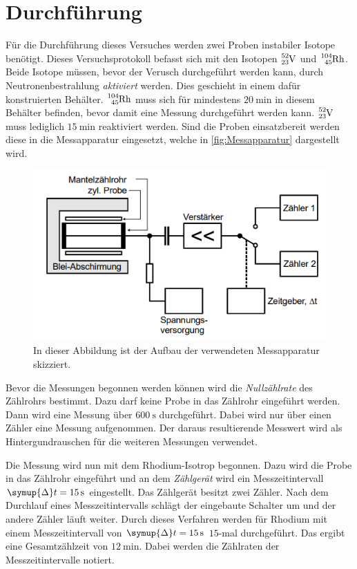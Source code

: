 \section{Durchführung}
\label{sec:Durchführung}
Für die Durchführung dieses Versuches werden zwei Proben instabiler Isotope benötigt. Dieses Versuchsprotokoll befasst sich mit den Isotopen $\ce{^{52}_{23}V}$ und 
$\ce{^{104}_{45}Rh}$. Beide Isotope müssen, bevor der Verusch durchgeführt werden kann, durch Neutronenbestrahlung \textit{aktiviert} werden. Dies geschieht in einem dafür
konstruierten Behälter. $\ce{^{104}_{45}Rh}$ muss sich für mindestens $\qty{20}{\minute}$ in diesem Behälter befinden, bevor damit eine Messung durchgeführt werden kann. 
$\ce{^{52}_{23}V}$ muss lediglich $\qty{15}{\minute}$ reaktiviert werden. Sind die Proben einsatzbereit werden diese in die Messapparatur eingesetzt, welche in
\autoref{fig:Messapparatur} dargestellt wird.  

\begin{figure}
    \centering
    \includegraphics[width = .7\textwidth]{content/Skizzeapparatur.png}
    \caption{In dieser Abbildung ist der Aufbau der verwendeten Messapparatur skizziert. \cite{v702}}
    \label{fig:Messapparatur}
\end{figure}

Bevor die Messungen begonnen werden können wird die \textit{Nullzählrate} des Zählrohrs bestimmt. Dazu darf keine Probe in das Zählrohr eingeführt werden. Dann wird eine Messung 
über $\qty{600}{\second}$ durchgeführt. Dabei wird nur über einen Zähler eine Messung aufgenommen. Der daraus resultierende Messwert wird als Hintergundrauschen für die weiteren
Messungen verwendet.

Die Messung wird nun mit dem Rhodium-Isotrop begonnen. Dazu wird die Probe in das Zählrohr eingeführt und an dem \textit{Zählgerät} wird ein Messzeitintervall 
$\symup{\Delta}t = \qty{15}{\second}$ eingestellt. Das Zählgerät besitzt zwei Zähler. Nach dem Durchlauf eines Messzeitintervalls schlägt der eingebaute Schalter um und der 
andere Zähler läuft weiter. Durch dieses Verfahren werden für Rhodium mit einem Messzeitintervall von $\symup{\Delta}t = \qty{15}{\second}$ $\num{15}$-mal durchgeführt. Das 
ergibt eine Gesamtzählzeit von $\qty{12}{\minute}$. Dabei werden die Zählraten der Messzeitintervalle notiert. 

